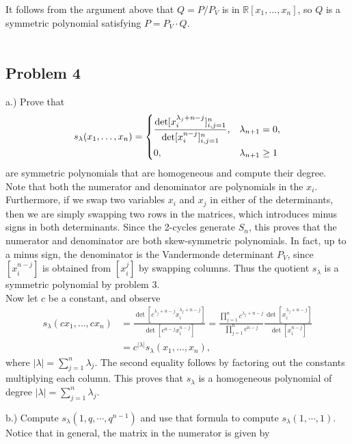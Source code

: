 \documentclass[12pt]{article}
\begin{document}
It follows from the argument above that $Q = P/P_V$ is in $\mathbb{R}[x_1,\dots,x_n]$, so $Q$ is a symmetric polynomial satisfying $P = P_V\cdot Q$.\\\\

\subsection*{Problem 4}

a.) Prove that 
\[
s_\lambda(x_1,\dots,x_n) = \begin{dcases}
\frac{\det [x_i^{\lambda_j+n-j}]_{i,j=1}^n}{\det [x_i^{n-j}]_{i,j=1}^n}, & \lambda_{n+1}=0,\\
0, & \lambda_{n+1}\geq 1
\end{dcases}
\]
are symmetric polynomials that are homogeneous and compute their degree.\\ 

Note that both the numerator and denominator are polynomials in the $x_i$. Furthermore, if we swap two variables $x_i$ and $x_j$ in either of the determinants, then we are simply swapping two rows in the matrices, which introduces minus signs in both determinants. Since the 2-cycles generate $S_n$, this proves that the numerator and denominator are both skew-symmetric polynomials. In fact, up to a minus sign, the denominator is the Vandermonde determinant $P_V$, since $[x_i^{n-j}]$ is obtained from $[x_i^j]$ by swapping columns. Thus the quotient $s_\lambda$ is a symmetric polynomial by problem 3.\\

Now let $c$ be a constant, and observe
\begin{align*}
s_\lambda(cx_1,\dots,cx_n) &= \frac{\det[c^{\lambda_j+n-j}x_i^{\lambda_j+n-j}]}{\det[c^{n-j}x_i^{n-j}]} = \frac{\prod_{j=1}^n c^{\lambda_j+n-j}}{\prod_{j=1}^n c^{n-j}} \frac{\det[x_i^{\lambda_j+n-j}]}{\det[x_i^{n-j}]}\\
&= c^{|\lambda|} s_\lambda(x_1,\dots,x_n),
\end{align*}
where $|\lambda| = \sum_{j=1}^n \lambda_j$. The second equality follows by factoring out the constants multiplying each column. This proves that $s_\lambda$ is a homogeneous polynomial of degree $|\lambda| = \sum_{j=1}^n \lambda_j$.


b.) Compute $s_\lambda(1, q, \cdots, q^{n-1}
)$ and use that formula to compute $s_\lambda (1, \cdots, 1)$.\\

Notice that in general, the matrix in the numerator is given by
\end{document}
